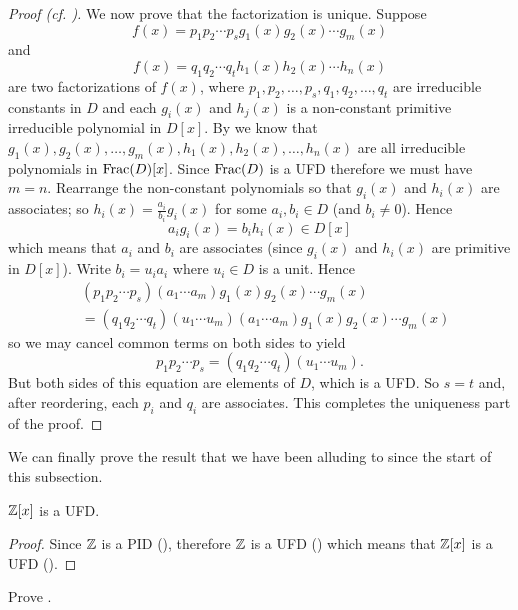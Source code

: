 \begin{proof}[Proof (cf. {\cite[Theorem 18.29]{judson_beezer_2022}})]
    We now prove that the factorization is unique. Suppose
    \[
        f(x) = p_1p_2\cdots p_s g_1(x)g_2(x) \cdots g_m(x)
    \]
    and
    \[
        f(x) = q_1q_2\cdots q_t h_1(x)h_2(x) \cdots h_n(x)
    \]
    are two factorizations of $f(x)$, where $p_1, p_2, \dots, p_s, q_1, q_2, \dots, q_t$ are irreducible constants in $D$ and each $g_i(x)$ and $h_j(x)$ is a non-constant primitive irreducible polynomial in $D[x]$. By  we know that $g_1(x), g_2(x), \dots, g_m(x), h_1(x), h_2(x), \dots, h_n(x)$ are all irreducible polynomials in $\mathrm{Frac}(D)[x]$. Since $\mathrm{Frac}(D)$ is a UFD therefore we must have $m = n$. Rearrange the non-constant polynomials so that $g_i(x)$ and $h_i(x)$ are associates; so $h_i(x) = \frac{a_i}{b_i}g_i(x)$ for some $a_i, b_i \in D$ (and $b_i \neq 0$). Hence
    \[
        a_i g_i(x) = b_i h_i(x) \in D[x]
    \]
    which means that $a_i$ and $b_i$ are associates (since $g_i(x)$ and $h_i(x)$ are primitive in $D[x]$). Write $b_i = u_ia_i$ where $u_i \in D$ is a unit. Hence
    \begin{align*}
        &(p_1p_2\cdots p_s)(a_1\cdots a_m) g_1(x)g_2(x) \cdots g_m(x)\\
        &= (q_1q_2\cdots q_t)(u_1\cdots u_m)(a_1\cdots a_m)g_1(x)g_2(x) \cdots g_m(x)
    \end{align*}
    so we may cancel common terms on both sides to yield
    \[
        p_1p_2\cdots p_s = (q_1q_2\cdots q_t)(u_1\cdots u_m).
    \]
    But both sides of this equation are elements of $D$, which is a UFD. So $s = t$ and, after reordering, each $p_i$ and $q_i$ are associates. This completes the uniqueness part of the proof.
\end{proof}

We can finally prove the result that we have been alluding to since the start of this subsection.

\begin{corollary}\label{corollary-Z-is-UFD}
    $\mathbb{Z}[x]$ is a UFD.
\end{corollary}
\begin{proof}
    Since $\mathbb{Z}$ is a PID (), therefore $\mathbb{Z}$ is a UFD () which means that $\mathbb{Z}[x]$ is a UFD ().
\end{proof}

\begin{exercise}\label{exercise-primitive-polynomial-irreducible-iff-polynomial-irreducible-in-field-of-fractions}
    Prove .
\end{exercise}

